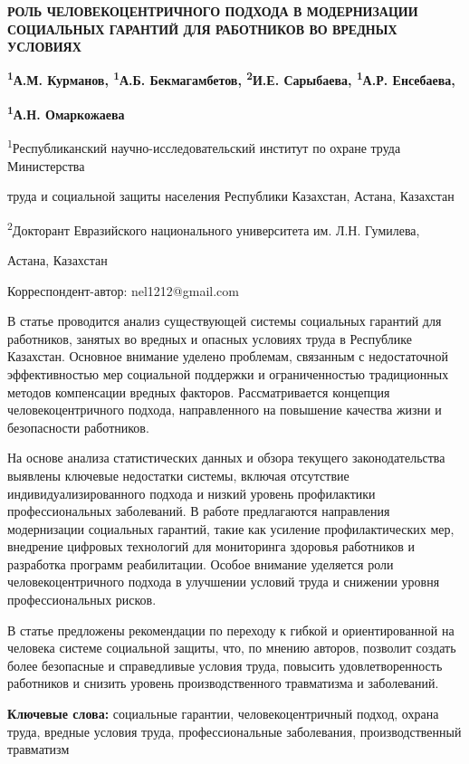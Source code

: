 


{\bfseries РОЛЬ ЧЕЛОВЕКОЦЕНТРИЧНОГО ПОДХОДА В МОДЕРНИЗАЦИИ СОЦИАЛЬНЫХ
ГАРАНТИЙ ДЛЯ РАБОТНИКОВ ВО ВРЕДНЫХ УСЛОВИЯХ}

{\bfseries \textsuperscript{1}А.М. Курманов, \textsuperscript{1}А.Б.
Бекмагамбетов, \textsuperscript{2}И.Е. Сарыбаева,
\textsuperscript{1}А.Р. Енсебаева\textsuperscript{\envelope },}

{\bfseries \textsuperscript{1}А.Н. Омаркожаева}

\textsuperscript{1}Республиканский научно-исследовательский институт по
охране труда Министерства

труда и социальной защиты населения Республики Казахстан, Астана,
Казахстан

\textsuperscript{2}Докторант Евразийского национального университета им.
Л.Н. Гумилева,

Астана, Казахстан

{\bfseries \textsuperscript{\envelope }}Корреспондент-автор: nel1212@gmail.com

В статье проводится анализ существующей системы социальных гарантий для
работников, занятых во вредных и опасных условиях труда в Республике
Казахстан. Основное внимание уделено проблемам, связанным с
недостаточной эффективностью мер социальной поддержки и ограниченностью
традиционных методов компенсации вредных факторов. Рассматривается
концепция человекоцентричного подхода, направленного на повышение
качества жизни и безопасности работников.

На основе анализа статистических данных и обзора текущего
законодательства выявлены ключевые недостатки системы, включая
отсутствие индивидуализированного подхода и низкий уровень профилактики
профессиональных заболеваний. В работе предлагаются направления
модернизации социальных гарантий, такие как усиление профилактических
мер, внедрение цифровых технологий для мониторинга здоровья работников и
разработка программ реабилитации. Особое внимание уделяется роли
человекоцентричного подхода в улучшении условий труда и снижении уровня
профессиональных рисков.

В статье предложены рекомендации по переходу к гибкой и ориентированной
на человека системе социальной защиты, что, по мнению авторов, позволит
создать более безопасные и справедливые условия труда, повысить
удовлетворенность работников и снизить уровень производственного
травматизма и заболеваний.

{\bfseries Ключевые слова:} социальные гарантии, человекоцентричный подход,
охрана труда, вредные условия труда, профессиональные заболевания,
производственный травматизм

